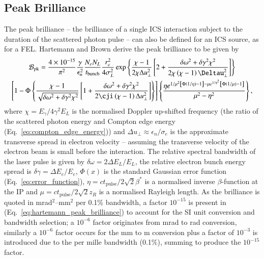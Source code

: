 \documentclass[../main.tex]{subfiles}
\begin{document}
\subsection{Peak Brilliance}
The peak brilliance -- the brilliance of a single ICS interaction subject to the duration of the scattered photon pulse -- can also be defined for an ICS source, as for a FEL. Hartemann and Brown \cite{hartemann2005high} derive the peak brilliance to be given by
\begin{multline}
\mathcal{B}_{\mathrm{pk}} = \frac{4\times 10^{-15}}{\pi^{2}}\frac{\gamma}{\epsilon_{n}^{2}}\frac{N_{e}N_{L}}{t_{\mathrm{bunch}}}\frac{r_{e}^{2}}{4\sigma_{L}^{2}}\exp\left\{\frac{\chi-1}{2\chi\Delta u_{\perp}^{2}}\left[2+\frac{\delta\omega^{2}+\delta\gamma^{2}\chi^{2}}{2\chi\left(\chi-1\right)\Deltau_{\perp}^{2}}\right]\right\} \\ \left[1-\Phi\left\{\frac{\chi-1}{\sqrt{\delta\omega^{2}+\delta\gamma^{2}\chi^{2}}}\left[1+\frac{\delta\omega^{2}+\delta\gamma^{2}\chi^{2}}{2\cji\left(\chi-1\right)\Delta u_{\perp}^{2}}\right]\right\}\right]\left\{\frac{\eta e^{1/\mu^{2}\left[\Phi\left(1/\eta\right)-1\right]-\mu e^{1/\eta^{2}}\left[\Phi\left(1/\mu\right)-1\right]}}{\mu^{2}-\eta^{2}}\right\},
\label{eq:hartemann_peak_brilliance}    
\end{multline}
where $\chi = E_{\gamma}/4\gamma^{2}E_{L}$ is the normalised Doppler up-shifted frequency (the ratio of the scattered photon energy and Compton edge energy (Eq.~\ref{eq:compton_edge_energy})) and $\Delta u_{\perp} \approx \epsilon_{n}/\sigma_{e}$ is the approximate transverse spread in electron velocity -- assuming the transverse velocity of the electron beam is small before the interaction. The relative spectral bandwidth of the laser pulse is given by $\delta\omega = 2\Delta E_{L}/E_{L}$, the relative electron bunch energy spread is $\delta\gamma = \Delta E_{e}/E_{e}$, $\Phi\left(x\right)$ is the standard Gaussian error function (Eq.~\ref{eq:error_function}), $\eta = ct_{\mathrm{pulse}}/2\sqrt{2}\beta^{*}$ is a normalised inverse $\beta$-function at the IP and $\mu = ct_{\mathrm{pulse}}/2\sqrt{2}z_{R}$ is a normalised Rayleigh length. As the brilliance is quoted in \si{\milli\radian}$^{2}$--\si{\milli\meter}$^{2}$ per 0.1\% bandwidth, a factor $10^{-15}$ is present in (Eq.~\ref{eq:hartemann_peak_brilliance}) to account for the SI unit conversion and bandwidth selection; a $10^{-6}$ factor originates from \si{\milli\radian} to \si{rad} conversion, similarly a $10^{-6}$ factor occurs for the \si{\milli\meter} to \si{\meter} conversion plus a factor of $10^{-3}$ is introduced due to the per mille bandwidth (0.1\%), summing to produce the $10^{-15}$ factor.
\end{document}
